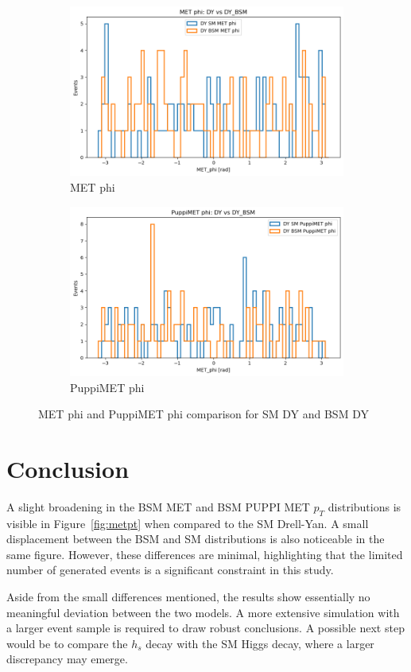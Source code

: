 \documentclass{CUP-JNL-DTM}%
\theoremstyle{definition}
\numberwithin{equation}{section}
\begin{document}
\begin{figure}[H]
    \begin{subfigure}{.5\textwidth}
      \centering
      \includegraphics[width=.85\linewidth]{img/met_phi.png}
      \caption{MET phi}
      \label{fig:sm_metphi}
    \end{subfigure}%
    \begin{subfigure}{.5\textwidth}
      \centering
      \includegraphics[width=.85\linewidth]{img/pmet_phi.png}
      \caption{PuppiMET phi}
      \label{fig:sm_pmetphi}
    \end{subfigure}
    \caption{MET phi and PuppiMET phi comparison for SM DY and BSM DY}
    \label{fig:metphi}
\end{figure}

\section{Conclusion}
A slight broadening in the BSM MET and BSM PUPPI MET $p_T$ distributions is visible in Figure~\ref{fig:metpt} when compared to the SM Drell-Yan. A small displacement between the BSM and SM distributions is also noticeable in the same figure. However, these differences are minimal, highlighting that the limited number of generated events is a significant constraint in this study.

Aside from the small differences mentioned, the results show essentially no meaningful deviation between the two models. A more extensive simulation with a larger event sample is required to draw robust conclusions. A possible next step would be to compare the $h_s$ decay with the SM Higgs decay, where a larger discrepancy may emerge.

\begin{Backmatter}

\printbibliography


\end{Backmatter}
\end{document}
